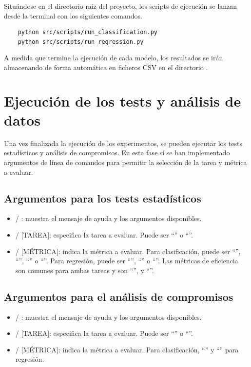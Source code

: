 \documentclass[a4paper,12pt,twoside,final]{book}
\begin{document}
Situándose en el directorio raíz del proyecto, los scripts de ejecución se lanzan desde la terminal con los siguientes
comandos.
\begin{verbatim}
    python src/scripts/run_classification.py
    python src/scripts/run_regression.py
\end{verbatim}

A medida que termine la ejecución de cada modelo, los resultados se irán almacenando de forma automática en ficheros CSV
en el directorio .

\section{Ejecución de los tests y análisis de datos}
Una vez finalizada la ejecución de los experimentos, se pueden ejecutar los tests estadísticos y análisis de compromisos.
En esta fase sí se han implementado argumentos de línea de comandos para permitir la selección de la tarea y métrica a
evaluar.

\subsection{Argumentos para los tests estadísticos}
\begin{itemize}
    \item {} / : muestra el mensaje de ayuda y los argumentos disponibles.
    \item {} /  [TAREA]: especifica la tarea a evaluar. Puede ser ``'' o
    ``''.
    \item {} /  [MÉTRICA]: indica la métrica a evaluar. Para clasificación, puede ser
    ``'', ``'', ``'' o ``''. Para regresión, puede ser
    ``'', ``'' o ``''. Las métricas de eficiencia son comunes para ambas tareas y son
    ``'',  y ``''.
\end{itemize}

\subsection{Argumentos para el análisis de compromisos}
\begin{itemize}
    \item {} / : muestra el mensaje de ayuda y los argumentos disponibles.
    \item {} /  [TAREA]: especifica la tarea a evaluar. Puede ser ``'' o
    ``''.
    \item {} /  [MÉTRICA]: indica la métrica a evaluar. Para clasificación, ``'' y
    ``'' para regresión.
\end{itemize}
\end{document}
